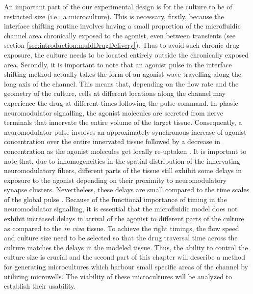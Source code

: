 An important part of the our experimental design is for the culture to be of restricted size (i.e., a microculture). This is necessary, firstly, because the interface shifting routine involves having a small proportion of the microfluidic channel area chronically exposed to the agonist, even between transients (see section \ref{sec:introduction:mufdDrugDelivery}). Thus to avoid such chronic drug exposure, the culture needs to be located entirely outside the chronically exposed area. Secondly, it is important to note that an agonist pulse in the interface shifting method actually takes the form of an agonist wave travelling along the long axis of the channel. This means that, depending on the flow rate and the geometry of the culture, cells at different locations along the channel may experience the drug at different times following the pulse command. In phasic neuromodulator signalling, the agonist molecules are secreted from nerve terminals that innervate the entire volume of the target tissue. Consequently, a neuromodulator pulse involves an approximately synchronous increase of agonist concentration over the entire innervated tissue followed by a decrease in concentration as the agonist molecules get locally re-uptaken \cite{arbuthnott2007space}. It is important to note that, due to inhomogeneities in the spatial distribution of the innervating neuromodulatory fibers, different parts of the tissue still exhibit some delays in exposure to the agonist depending on their proximity to neuromodulatory synapse clusters. Nevertheless, these delays are small compared to the time scales of the global pulse \cite{arbuthnott2007space,venton2003real}. Because of the functional importance of timing in the neuromodulator signalling, it is essential that the microfluidic model does not exhibit increased delays in arrival of the agonist to different parts of the culture as compared to the \textit{in vivo} tissue. To achieve the right timings, the flow speed and culture size need to be selected so that the drug traversal time across the culture matches the delays in the modeled tissue. Thus, the ability to control the culture size is crucial and the second part of this chapter will describe a method for generating microcultures which harbour small specific areas of the channel by utilizing microwells. The viability of these microcultures will be analyzed to establish their usability.

